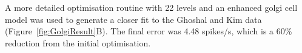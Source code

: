 A more detailed optimisation routine with 22 levels and an enhanced
golgi cell model was used to generate a closer fit to the Ghoshal and
Kim data (Figure~\ref{fig:GolgiResult}B).  The final error was 4.48
spikes/s, which is a 60\% reduction from the initial optimisation.

















